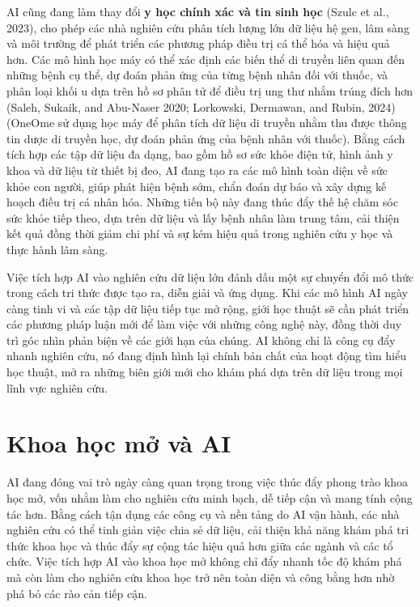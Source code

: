 AI cũng đang làm thay đổi \textbf{y học chính xác và tin sinh học} (Szulc et al., 2023), cho phép các nhà nghiên cứu phân tích lượng lớn dữ liệu hệ gen, lâm sàng và môi trường để phát triển các phương pháp điều trị cá thể hóa và hiệu quả hơn. Các mô hình học máy có thể xác định các biến thể di truyền liên quan đến những bệnh cụ thể, dự đoán phản ứng của từng bệnh nhân đối với thuốc, và phân loại khối u dựa trên hồ sơ phân tử để điều trị ung thư nhắm trúng đích hơn (Saleh, Sukaik, and Abu-Naser 2020; Lorkowski, Dermawan, and Rubin, 2024) (OneOme sử dụng học máy để phân tích dữ liệu di truyền nhằm thu được thông tin dược di truyền học, dự đoán phản ứng của bệnh nhân với thuốc). Bằng cách tích hợp các tập dữ liệu đa dạng, bao gồm hồ sơ sức khỏe điện tử, hình ảnh y khoa và dữ liệu từ thiết bị đeo, AI đang tạo ra các mô hình toàn diện về sức khỏe con người, giúp phát hiện bệnh sớm, chẩn đoán dự báo và xây dựng kế hoạch điều trị cá nhân hóa. Những tiến bộ này đang thúc đẩy thế hệ chăm sóc sức khỏe tiếp theo, dựa trên dữ liệu và lấy bệnh nhân làm trung tâm, cải thiện kết quả đồng thời giảm chi phí và sự kém hiệu quả trong nghiên cứu y học và thực hành lâm sàng.

Việc tích hợp AI vào nghiên cứu dữ liệu lớn đánh dấu một sự chuyển đổi mô thức trong cách tri thức được tạo ra, diễn giải và ứng dụng. Khi các mô hình AI ngày càng tinh vi và các tập dữ liệu tiếp tục mở rộng, giới học thuật sẽ cần phát triển các phương pháp luận mới để làm việc với những công nghệ này, đồng thời duy trì góc nhìn phản biện về các giới hạn của chúng. AI không chỉ là công cụ đẩy nhanh nghiên cứu, nó đang định hình lại chính bản chất của hoạt động tìm hiểu học thuật, mở ra những biên giới mới cho khám phá dựa trên dữ liệu trong mọi lĩnh vực nghiên cứu.

\section{Khoa học mở và AI}

AI đang đóng vai trò ngày càng quan trọng trong việc thúc đẩy phong trào khoa học mở, vốn nhằm làm cho nghiên cứu minh bạch, dễ tiếp cận và mang tính cộng tác hơn. Bằng cách tận dụng các công cụ và nền tảng do AI vận hành, các nhà nghiên cứu có thể tinh giản việc chia sẻ dữ liệu, cải thiện khả năng khám phá tri thức khoa học và thúc đẩy sự cộng tác hiệu quả hơn giữa các ngành và các tổ chức. Việc tích hợp AI vào khoa học mở không chỉ đẩy nhanh tốc độ khám phá mà còn làm cho nghiên cứu khoa học trở nên toàn diện và công bằng hơn nhờ phá bỏ các rào cản tiếp cận.

